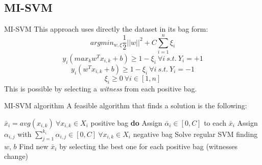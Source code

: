 \subsection{MI-SVM}
\begin{frame}{MI-SVM}
	This approach uses directly the dataset in its bag form:
	$$arg min_{w, \xi} \frac{1}{2} ||w||^2 + C \sum_{i = 1}^{n}\xi_i$$
	$$y_i (max_k w^T x_{i,k} + b) \geq 1 - \xi_i \ \forall i \ s.t. \ Y_i = +1$$
	$$y_i (w^T x_{i,k} + b) \geq 1 - \xi_i \ \forall i \ s.t. \ Y_i = -1$$
	$$\xi_i \geq 0 \ \forall i \in [1, n]$$
	This is possible by selecting a \textit{witness} from each positive bag.
\end{frame}

\begin{frame}{MI-SVM algorithm}
	A feasible algorithm that finds a solution is the following:
	
	\begin{codebox}
		\li $\bar{x}_i = avg(x_{i,k}) \ \forall x_{i,k} \in X_i$ positive bag
		\li \textbf{do} \Do
		\li Assign $\bar{\alpha}_i \in [0,C]$ to each $\bar{x}_i$
		\li Assign $\alpha_{i,j}$ with $\sum_{j=1}^{k_i}\alpha_{i,j} \in [0,C] \ \forall x_{i,k} \in X_i$ negative bag
		\li Solve regular SVM finding $w$, $b$
		\li Find new $\bar{x}_i$ by selecting the best one for each positive bag \End
		\li \While(witnesses change)
		
	\end{codebox}
	
\end{frame}


